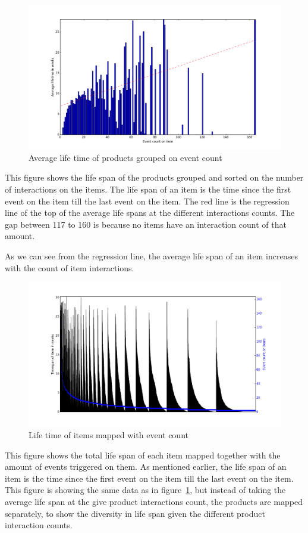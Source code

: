     \begin{figure}[H]
        \includegraphics[width=5in]{image/avglifetimeoncount.png}
        \centering
        \caption{Average life time of products grouped on event count}
    \label{figure:averageLifetimBasedoncount}
    \end{figure}
        This figure shows the life span of the products grouped and sorted on the number of interactions on the items.
        The life span of an item is the time since the first event on the item till the last event on the item.
        The red line is the regression line of the top of the average life spans at the different interactions counts.
        The gap between 117 to 160 is because no items have an interaction count of that amount.

        As we can see from the regression line, the average life span of an item increases with the count of item interactions.

    \begin{figure}[H]
        \includegraphics[width=5in]{image/itemTimeSpansortedoneventcount.png}
        \centering
        \caption{Life time of items mapped with event count}
    \label{figure:itemTimeSpanEventCount}
    \end{figure}
        This figure shows the total life span of each item mapped together with the amount of events triggered on them.
        As mentioned earlier, the life span of an item is the time since the first event on the item till the last event on the item.
        This figure is showing the same data as in figure~\ref{figure:averageLifetimBasedoncount}, but instead of taking the average life span at the give product interactions count, the products are mapped separately, to show the diversity in life span given the different product interaction counts.

